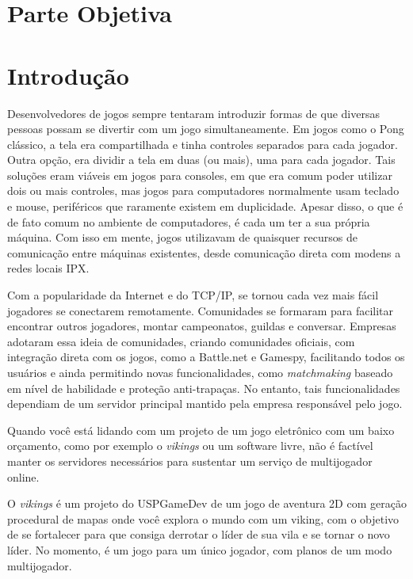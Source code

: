 \chapter*{Parte Objetiva}
\label{sec:parte_objetiva}
\chapter{Introdução}
\label{sec:intr}

Desenvolvedores de jogos sempre tentaram introduzir formas de que diversas
pessoas possam se divertir com um jogo simultaneamente. Em jogos como o Pong
clássico, a tela era compartilhada e tinha controles separados para cada 
jogador. Outra opção, era dividir a tela em duas (ou mais), uma para cada
jogador. Tais soluções eram viáveis em jogos para consoles, em que era comum
poder utilizar dois ou mais controles, mas jogos para computadores normalmente
usam teclado e mouse, periféricos que raramente existem em duplicidade.
Apesar disso, o que é de fato comum no ambiente de computadores, é cada um ter
a sua própria máquina. Com isso em mente, jogos utilizavam de quaisquer recursos
de comunicação entre máquinas existentes, desde comunicação direta com modens
a redes locais IPX.

Com a popularidade da Internet e do TCP/IP, se tornou cada vez mais fácil
jogadores se conectarem remotamente. Comunidades se formaram para facilitar
encontrar outros jogadores, montar campeonatos, guildas e conversar. Empresas
adotaram essa ideia de comunidades, criando comunidades oficiais, com integração
direta com os jogos, como a Battle.net e Gamespy, facilitando todos os usuários 
e ainda permitindo novas funcionalidades, como \textit{matchmaking} baseado em
nível de habilidade e proteção anti-trapaças. No entanto, tais funcionalidades
dependiam de um servidor principal mantido pela empresa responsável pelo jogo.

Quando você está lidando com um projeto de um jogo eletrônico com um baixo
orçamento, como por exemplo o \textit{vikings} ou um software livre, não é
factível manter os servidores necessários para sustentar um serviço de
multijogador online.

O \textit{vikings} é um projeto do USPGameDev de um jogo de aventura 2D com geração
procedural de mapas onde você explora o mundo com um viking, com o objetivo de se
fortalecer para que consiga derrotar o líder de sua vila e se tornar o novo líder.
No momento, é um jogo para um único jogador, com planos de um modo multijogador.

